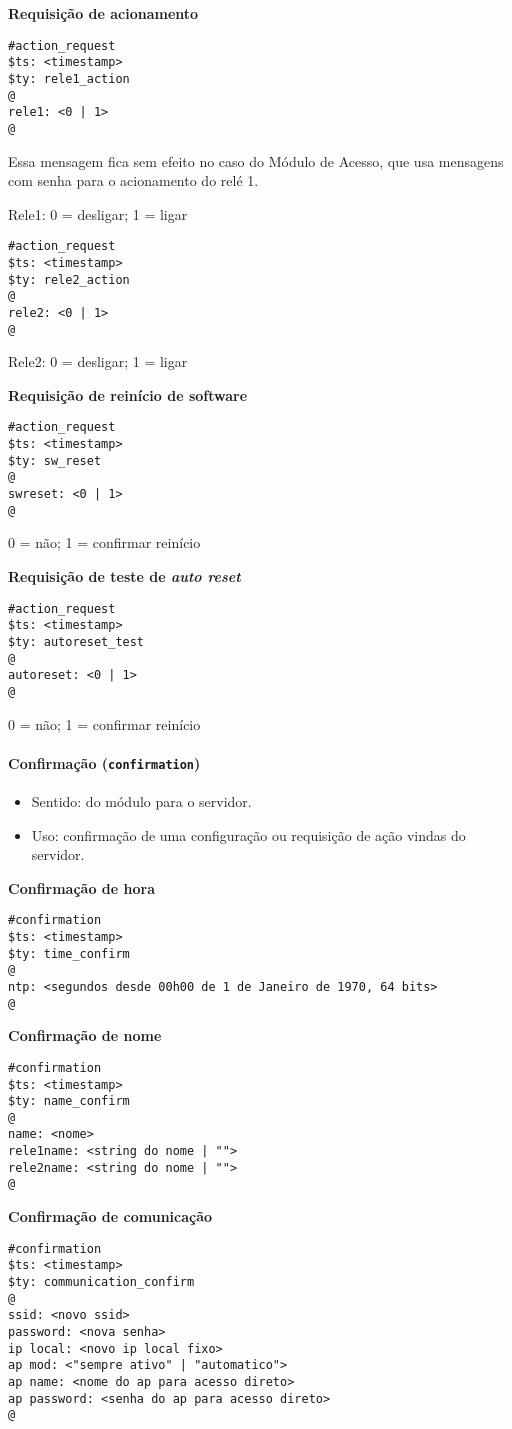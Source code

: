 \textbf{Requisição de acionamento}
\begin{lstlisting}
#action_request
$ts: <timestamp>
$ty: rele1_action
@
rele1: <0 | 1>
@
\end{lstlisting}
Essa mensagem fica sem efeito no caso do Módulo de Acesso, que usa mensagens com senha para o acionamento do relé 1.

Rele1: 0 = desligar; 1 = ligar

\begin{lstlisting}
#action_request
$ts: <timestamp>
$ty: rele2_action
@
rele2: <0 | 1>
@
\end{lstlisting}
Rele2: 0 = desligar; 1 = ligar

\textbf{Requisição de reinício de software}
\begin{lstlisting}
#action_request
$ts: <timestamp>
$ty: sw_reset
@
swreset: <0 | 1>
@
\end{lstlisting}
0 = não; 1 = confirmar reinício

\textbf{Requisição de teste de \emph{auto reset}}
\begin{lstlisting}
#action_request
$ts: <timestamp>
$ty: autoreset_test
@
autoreset: <0 | 1>
@
\end{lstlisting}
0 = não; 1 = confirmar reinício

\paragraph{Confirmação (\texttt{confirmation})}
\begin{itemize}
\item Sentido: do módulo para o servidor.
\item Uso: confirmação de uma configuração ou requisição de ação vindas do servidor.
\end{itemize}

\textbf{Confirmação de hora}
\begin{lstlisting}
#confirmation
$ts: <timestamp>
$ty: time_confirm
@
ntp: <segundos desde 00h00 de 1 de Janeiro de 1970, 64 bits>
@
\end{lstlisting}

\textbf{Confirmação de nome}
\begin{lstlisting}
#confirmation
$ts: <timestamp>
$ty: name_confirm
@
name: <nome>
rele1name: <string do nome | "">
rele2name: <string do nome | "">
@
\end{lstlisting}

\textbf{Confirmação de comunicação}
\begin{lstlisting}
#confirmation
$ts: <timestamp>
$ty: communication_confirm
@
ssid: <novo ssid>
password: <nova senha>
ip local: <novo ip local fixo>
ap mod: <"sempre ativo" | "automatico">
ap name: <nome do ap para acesso direto>
ap password: <senha do ap para acesso direto>
@
\end{lstlisting}

